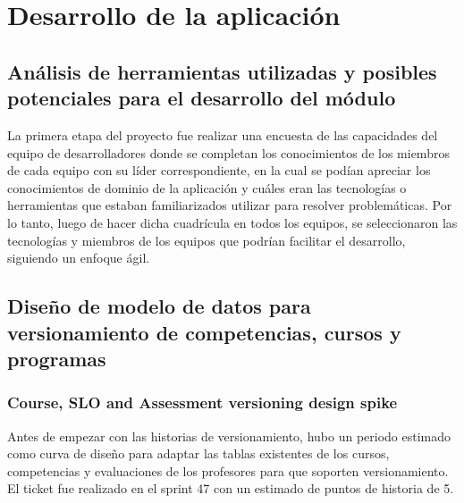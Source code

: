 \chapter{Desarrollo de la aplicación} %
\label{capitulo6} %

\section{Análisis de herramientas utilizadas y posibles potenciales para el desarrollo del módulo}
La primera etapa del proyecto fue realizar una encuesta de las capacidades del equipo de desarrolladores donde se completan los conocimientos de los miembros de cada equipo con su líder correspondiente, en la cual se podían apreciar los conocimientos de dominio de la aplicación y cuáles eran las tecnologías o herramientas que estaban familiarizados utilizar para resolver problemáticas. Por lo tanto, luego de hacer dicha cuadrícula en todos los equipos, se seleccionaron las tecnologías y miembros de los equipos que podrían facilitar el desarrollo, siguiendo un enfoque ágil.

\section{Diseño de modelo de datos para versionamiento de competencias, cursos y programas}
\subsection{Course, SLO and Assessment versioning design spike}
Antes de empezar con las historias de versionamiento, hubo un periodo estimado como curva de diseño para adaptar las tablas existentes de los cursos, competencias y evaluaciones de los profesores para que soporten versionamiento. El ticket fue realizado en el sprint 47 con un estimado de puntos de historia de 5.


